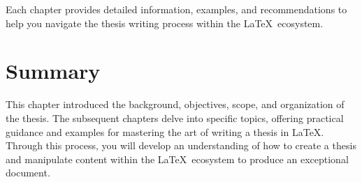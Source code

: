 		Each chapter provides detailed information, examples, and recommendations to help you navigate the thesis writing process within the \LaTeX\ ecosystem.

	\section{Summary}
		This chapter introduced the background, objectives, scope, and organization of the thesis. 
		The subsequent chapters delve into specific topics, offering practical guidance and examples for mastering the art of writing a thesis in \LaTeX.
		Through this process, you will develop an understanding of how to create a thesis and manipulate content within the \LaTeX\ ecosystem to produce an exceptional document.